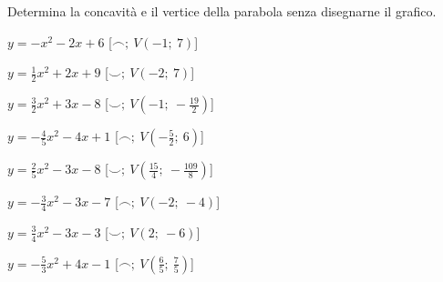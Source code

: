 \begin{esercizio}\label{ese:}
 Determina la concavità e il vertice della parabola senza disegnarne il grafico.
\begin{multicols}{2}
  \begin{enumeratea}
  \item  \(y=- x^2 -2 x +6\)
   \hfill [\(\smallfrown;~V \left (-1;~7 \right )\)]
  \item  \(y=\frac{1}{2} x^2 +2 x +9\)
   \hfill [\(\smallsmile;~V \left (-2;~7 \right )\)]
  \item  \(y=\frac{3}{2} x^2 +3 x -8\)
   \hfill [\(\smallsmile;~V \left (-1;~-\frac{19}{2} \right )\)]
  \item  \(y=-\frac{4}{5} x^2 -4 x +1\)
   \hfill [\(\smallfrown;~V \left (-\frac{5}{2};~6 \right )\)]
  \item  \(y=\frac{2}{5} x^2 -3 x -8\)
   \hfill [\(\smallsmile;~V \left (\frac{15}{4};~-\frac{109}{8} \right )\)]
  \item  \(y=-\frac{3}{4} x^2 -3 x -7\)
   \hfill [\(\smallfrown;~V \left (-2;~-4 \right )\)]
  \item  \(y=\frac{3}{4} x^2 -3 x -3\)
   \hfill [\(\smallsmile;~V \left (2;~-6 \right )\)]
  \item  \(y=-\frac{5}{3} x^2 +4 x -1\)
   \hfill [\(\smallfrown;~V \left (\frac{6}{5};~\frac{7}{5} \right )\)]
 \end{enumeratea}
\end{multicols}
\end{esercizio}

